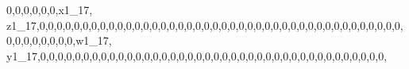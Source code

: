 \documentclass[]{article}
\newenvironment{Shaded}{\begin{snugshade}}{\end{snugshade}}
\newcommand{\DecValTok}[1]{\textcolor[rgb]{0.00,0.00,0.81}{#1}}
\newcommand{\NormalTok}[1]{#1}
\begin{document}
\begin{Shaded}
\begin{Highlighting}[]
\DecValTok{0}\NormalTok{,}\DecValTok{0}\NormalTok{,}\DecValTok{0}\NormalTok{,}\DecValTok{0}\NormalTok{,}\DecValTok{0}\NormalTok{,}\DecValTok{0}\NormalTok{,x1_}\DecValTok{17}\NormalTok{, z1_}\DecValTok{17}\NormalTok{,}\DecValTok{0}\NormalTok{,}\DecValTok{0}\NormalTok{,}\DecValTok{0}\NormalTok{,}\DecValTok{0}\NormalTok{,}\DecValTok{0}\NormalTok{,}\DecValTok{0}\NormalTok{,}\DecValTok{0}\NormalTok{,}\DecValTok{0}\NormalTok{,}\DecValTok{0}\NormalTok{,}\DecValTok{0}\NormalTok{,}\DecValTok{0}\NormalTok{,}\DecValTok{0}\NormalTok{,}\DecValTok{0}\NormalTok{,}\DecValTok{0}\NormalTok{,}\DecValTok{0}\NormalTok{,}\DecValTok{0}\NormalTok{,}\DecValTok{0}\NormalTok{,}\DecValTok{0}\NormalTok{,}\DecValTok{0}\NormalTok{,}\DecValTok{0}\NormalTok{,}\DecValTok{0}\NormalTok{,}\DecValTok{0}\NormalTok{,}\DecValTok{0}\NormalTok{,}\DecValTok{0}\NormalTok{,}\DecValTok{0}\NormalTok{,}\DecValTok{0}\NormalTok{,}\DecValTok{0}\NormalTok{,}\DecValTok{0}\NormalTok{,}\DecValTok{0}\NormalTok{,}\DecValTok{0}\NormalTok{,}\DecValTok{0}\NormalTok{,}\DecValTok{0}\NormalTok{,}\DecValTok{0}\NormalTok{,}\DecValTok{0}\NormalTok{,}\DecValTok{0}\NormalTok{,}\DecValTok{0}\NormalTok{,}\DecValTok{0}\NormalTok{,}\DecValTok{0}\NormalTok{,}\DecValTok{0}\NormalTok{,}\DecValTok{0}\NormalTok{,}\DecValTok{0}\NormalTok{,}\DecValTok{0}\NormalTok{,}
\DecValTok{0}\NormalTok{,}\DecValTok{0}\NormalTok{,}\DecValTok{0}\NormalTok{,}\DecValTok{0}\NormalTok{,}\DecValTok{0}\NormalTok{,}\DecValTok{0}\NormalTok{,}\DecValTok{0}\NormalTok{,}\DecValTok{0}\NormalTok{,w1_}\DecValTok{17}\NormalTok{, y1_}\DecValTok{17}\NormalTok{,}\DecValTok{0}\NormalTok{,}\DecValTok{0}\NormalTok{,}\DecValTok{0}\NormalTok{,}\DecValTok{0}\NormalTok{,}\DecValTok{0}\NormalTok{,}\DecValTok{0}\NormalTok{,}\DecValTok{0}\NormalTok{,}\DecValTok{0}\NormalTok{,}\DecValTok{0}\NormalTok{,}\DecValTok{0}\NormalTok{,}\DecValTok{0}\NormalTok{,}\DecValTok{0}\NormalTok{,}\DecValTok{0}\NormalTok{,}\DecValTok{0}\NormalTok{,}\DecValTok{0}\NormalTok{,}\DecValTok{0}\NormalTok{,}\DecValTok{0}\NormalTok{,}\DecValTok{0}\NormalTok{,}\DecValTok{0}\NormalTok{,}\DecValTok{0}\NormalTok{,}\DecValTok{0}\NormalTok{,}\DecValTok{0}\NormalTok{,}\DecValTok{0}\NormalTok{,}\DecValTok{0}\NormalTok{,}\DecValTok{0}\NormalTok{,}\DecValTok{0}\NormalTok{,}\DecValTok{0}\NormalTok{,}\DecValTok{0}\NormalTok{,}\DecValTok{0}\NormalTok{,}\DecValTok{0}\NormalTok{,}\DecValTok{0}\NormalTok{,}\DecValTok{0}\NormalTok{,}\DecValTok{0}\NormalTok{,}\DecValTok{0}\NormalTok{,}\DecValTok{0}\NormalTok{,}\DecValTok{0}\NormalTok{,}\DecValTok{0}\NormalTok{,}\DecValTok{0}\NormalTok{,}\DecValTok{0}\NormalTok{,}\DecValTok{0}\NormalTok{,}

\end{Highlighting}
\end{Shaded}
\end{document}
